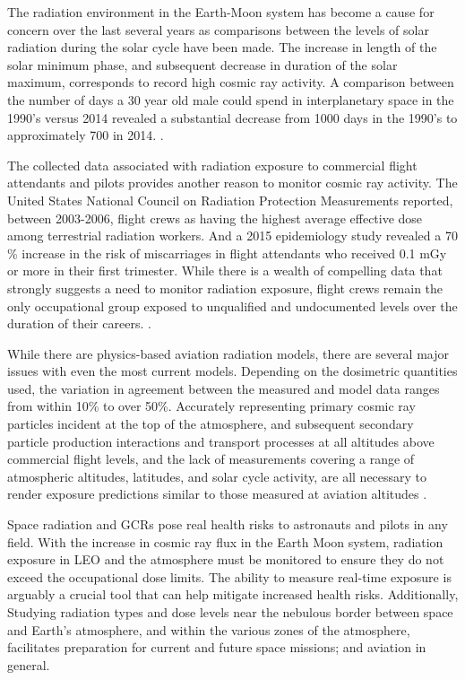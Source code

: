 


The radiation environment in the Earth-Moon system has become a cause for concern over the last several years as comparisons between the levels of solar radiation during the solar cycle have been made. The increase in length of the solar minimum phase, and subsequent decrease in duration of the solar maximum, corresponds to record high cosmic ray activity.  A comparison between the number of days a 30 year old male could spend in interplanetary space in the 1990's versus 2014 revealed a substantial decrease from 1000 days in the 1990's to approximately 700 in 2014. \cite{cosmic_flux}.

The collected data associated with radiation exposure to commercial flight attendants and pilots provides another reason to monitor cosmic ray activity.  The United States National Council on Radiation Protection Measurements reported, between 2003-2006, flight crews as having the highest average effective dose among terrestrial radiation workers.  And a 2015 epidemiology study revealed a 70 \% increase in the risk of miscarriages in flight attendants who received 0.1 mGy or more in their first trimester.  While there is a wealth of compelling data that strongly suggests a need to monitor radiation exposure, flight crews remain the only occupational group exposed to unqualified and undocumented levels over the duration of their careers. \cite{human_impact}.

While there are physics-based aviation radiation models, there are several major issues with even the most current models. Depending on the dosimetric quantities used, the variation in agreement between the measured and model data ranges from within 10\% to over 50\%. Accurately representing primary cosmic ray particles incident at the top of the atmosphere, and subsequent secondary particle production interactions and transport processes at all altitudes above commercial flight levels, and the lack of measurements covering a range of atmospheric altitudes, latitudes, and solar cycle activity, are all necessary to render exposure predictions similar to those measured at aviation altitudes \cite{modeling}. 

Space radiation and GCRs pose real health risks to astronauts and pilots in any field.  With the increase in cosmic ray flux in the Earth Moon system, radiation exposure in LEO and the atmosphere must be monitored to ensure they do not exceed the occupational dose limits.  The ability to measure real-time exposure is arguably a crucial tool that can help mitigate increased health risks.  Additionally, Studying radiation types and dose levels near the nebulous border between space and Earth's atmosphere, and within the various zones of the atmosphere, facilitates preparation for current and future space missions; and aviation in general. 


